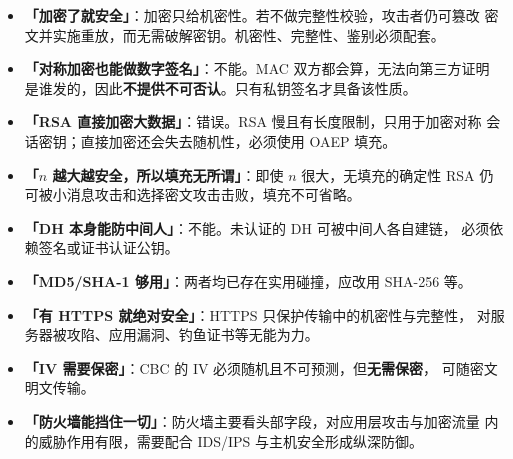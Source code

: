 \begin{itemize}
    \item \textbf{「加密了就安全」}：加密只给机密性。若不做完整性校验，攻击者仍可篡改
    密文并实施重放，而无需破解密钥。机密性、完整性、鉴别必须配套。
    \item \textbf{「对称加密也能做数字签名」}：不能。MAC 双方都会算，无法向第三方证明
    是谁发的，因此\textbf{不提供不可否认}。只有私钥签名才具备该性质。
    \item \textbf{「RSA 直接加密大数据」}：错误。RSA 慢且有长度限制，只用于加密对称
    会话密钥；直接加密还会失去随机性，必须使用 OAEP 填充。
    \item \textbf{「$n$ 越大越安全，所以填充无所谓」}：即使 $n$ 很大，无填充的确定性 RSA
    仍可被小消息攻击和选择密文攻击击败，填充不可省略。
    \item \textbf{「DH 本身能防中间人」}：不能。未认证的 DH 可被中间人各自建链，
    必须依赖签名或证书认证公钥。
    \item \textbf{「MD5/SHA-1 够用」}：两者均已存在实用碰撞，应改用 SHA-256 等。
    \item \textbf{「有 HTTPS 就绝对安全」}：HTTPS 只保护传输中的机密性与完整性，
    对服务器被攻陷、应用漏洞、钓鱼证书等无能为力。
    \item \textbf{「IV 需要保密」}：CBC 的 IV 必须随机且不可预测，但\textbf{无需保密}，
    可随密文明文传输。
    \item \textbf{「防火墙能挡住一切」}：防火墙主要看头部字段，对应用层攻击与加密流量
    内的威胁作用有限，需要配合 IDS/IPS 与主机安全形成纵深防御。
\end{itemize}
